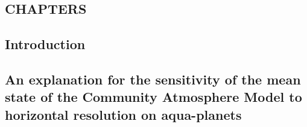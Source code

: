\documentclass[12pt]{article}
\begin{document}
\newpage
{}

\newpage
\begin{center}
\section*{\bf{\normalsize CHAPTERS}}
\end{center}

\newpage
\begin{center}
\section{Introduction}
\end{center}


\newpage
\begin{center}
\section{An explanation for the sensitivity of the mean state of the Community Atmosphere Model to horizontal resolution on aqua-planets}
\end{center}

\end{document}
